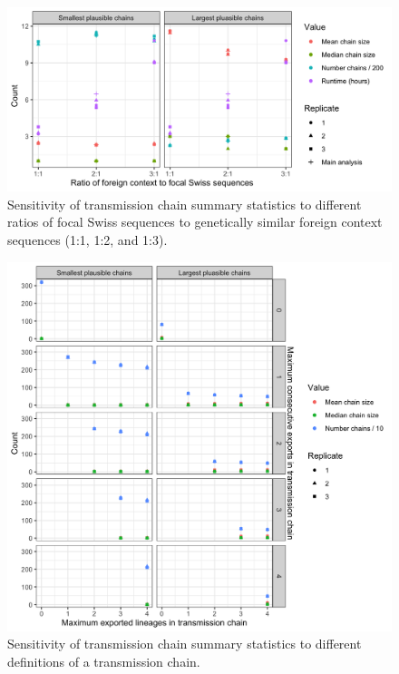 \documentclass[9pt,twoside,lineno]{pnas-new}
\begin{document}
\begin{figure}
\centering
\includegraphics[width = 11.4cm]{figures/fig_SX_sensitivity_context_set_size.png}
\caption{Sensitivity of transmission chain summary statistics to different ratios of focal Swiss sequences to genetically similar foreign context sequences (1:1, 1:2, and 1:3).}  
\label{fig:sensitivity_context_set_size}
\end{figure}

\begin{figure}
\centering
\includegraphics[width = 11.4cm]{figures/fig_SX_sensitivity_chain_defn.png}
\caption{Sensitivity of transmission chain summary statistics to different definitions of a transmission chain.}  
\label{fig:sensitivity_m_p}
\end{figure}
\end{document}
